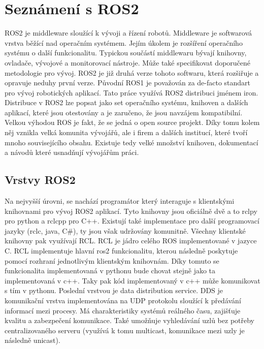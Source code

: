 \section{Seznámení s ROS2}
ROS2 je middleware sloužící k vývoji a řízení robotů. Middleware je softwarová vrstva běžící nad operačním systémem. Jejím úkolem je rozšíření operačního systému o další funkcionalitu. Typickou součástí middlewaru bývají knihovny, ovladače, vývojové a monitorovací nástroje. Může také specifikovat doporučené metodologie pro vývoj. ROS2 je již druhá verze tohoto softwaru, která rozšiřuje a opravuje neduhy první verze. Původní ROS1 je považován za de-facto standart pro vývoj robotických aplikací.
Tato práce využívá ROS2 distribuci jménem iron. Distribuce v ROS2 lze popsat jako set operačního systému, knihoven a dalších aplikací, které jsou otestovány a je zaručeno, že jsou navzájem kompatibilní. Velkou výhodou ROS je fakt, že se jedná o open source projekt. Díky tomu kolem něj vznikla velká komunita vývojářů, ale i firem a dalších institucí, které tvoří mnoho souvisejícího obsahu. Existuje tedy velké množství knihoven, dokumentací a návodů které usnadňují vývojářům práci. \cite{ros2_introduction}

\subsection*{Vrstvy ROS2}
Na nejvyšší úrovni, se nachází programátor který interaguje s klientskými knihovnami pro vývoj ROS2 aplikací. Tyto knihovny jsou oficiálně dvě a to rclpy pro python a rclcpp pro C++. Existují také implementace pro další programovací jazyky (rclc, java, C\#), ty jsou však udržovány komunitně. Všechny klientské knihovny pak využívají RCL. RCL je jádro celého ROS implementované v jazyce C. RCL implementuje hlavní ros2 funkcionalitu, kterou následně poskytuje pomocí rozhraní jednotlivým klientským knihovnám. Díky tomuto se funkcionalita implementovaná v pythonu bude chovat stejně jako ta implementovaná v c++. Taky pak kód implementovaný v c++ může komunikovat s tím v pythonu.
Poslední vrstvou je data distribution service. DDS je komunikační vrstva implementována na UDP protokolu sloužící k předávání informací mezi procesy. Má charakteristiky systémů reálného času, zajišťuje kvalitu a zabezpečení komunikace. Také umožňuje vyhledávání uzlů bez potřeby centralizovaného serveru (využívá k tomu multicast, komunikace mezi uzly je následně unicast). \cite{ros2_introduction}

